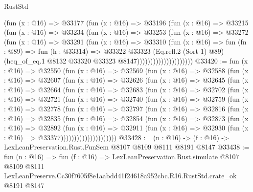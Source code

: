 \begin{lexlean}{RustStd}
\begin{coremodule}
                          (fun (x : @16) =>
                          @33177
                            (fun (x : @16) =>
                            @33196
                              (fun (x : @16) =>
                              @33215
                                (fun (x : @16) =>
                                @33234
                                  (fun (x : @16) =>
                                  @33253
                                    (fun (x : @16) =>
                                    @33272
                                      (fun (x : @16) =>
                                      @33291
                                        (fun (x : @16) =>
                                        @33310
                                          (fun (x : @16) =>
                                          fun (fn : @89) =>
                                          fun (h : @33314) =>
                                          @33322
                                            @33323
                                            (Eq.refl.{2} (Sort 1) @89)
                                            (heq_of_eq.{1}
                                              @8132
                                              @33320
                                              @33323
                                              @8147)))))))))))))))))))))
@33420 := fun (x : @16) =>
  @32550
    (fun (x : @16) =>
    @32569
      (fun (x : @16) =>
      @32588
        (fun (x : @16) =>
        @32607
          (fun (x : @16) =>
          @32626
            (fun (x : @16) =>
            @32645
              (fun (x : @16) =>
              @32664
                (fun (x : @16) =>
                @32683
                  (fun (x : @16) =>
                  @32702
                    (fun (x : @16) =>
                    @32721
                      (fun (x : @16) =>
                      @32740
                        (fun (x : @16) =>
                        @32759
                          (fun (x : @16) =>
                          @32778
                            (fun (x : @16) =>
                            @32797
                              (fun (x : @16) =>
                              @32816
                                (fun (x : @16) =>
                                @32835
                                  (fun (x : @16) =>
                                  @32854
                                    (fun (x : @16) =>
                                    @32873
                                      (fun (x : @16) =>
                                      @32892
                                        (fun (x : @16) =>
                                        @32911
                                          (fun (x : @16) =>
                                          @32930 (fun (x : @16) => @33377)))))))))))))))))))))
@33428 := (n : @16) -> (f : @16) -> LexLeanPreservation.Rust.FunSem @8107 @8109 @8111 @8191 @8147
@33438 := fun (n : @16) =>
  fun (f : @16) =>
  LexLeanPreservation.Rust.simulate
    @8107
    @8109
    @8111
    LexLeanPreserve.Cc30f7605f8e1aabdd41f24618a952cbc.R16.RustStd.crate_ok
    @8191
    @8147
\end{coremodule}
\end{lexlean}
